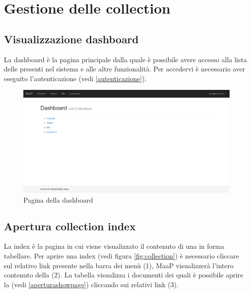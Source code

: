 \section{Gestione delle collection}

	\subsection{Visualizzazione dashboard} %
	\label{visualizzazionedashboard}
	La dashboard è la pagina principale dalla quale è possibile avere accesso alla lista delle  presenti nel sistema e alle altre funzionalità. Per accedervi è necessario aver eseguito l'autenticazione (vedi \ref{autenticazione}).

	\begin{figure}[H]
	\label{fig:dashboard}
		\centering \includegraphics[width=1\textwidth]{img/dashboard.png}
	\caption{Pagina della dashboard}
	\end{figure}
	

	\subsection{Apertura collection index} %
	\label{aperturacollectionindex}
	La  index è la pagina in cui viene visualizzato il contenuto di una  in forma tabellare. Per aprire una  index (vedi figura \ref{fig:collection}) è necessario cliccare sul relativo link presente nella barra dei menù (1), MaaP visualizzerà l'intero contenuto della  (2). La tabella visualizza i documenti dei quali è possibile aprire la  (vedi \ref{aperturashowpage}) cliccando sui relativi link (3). %

